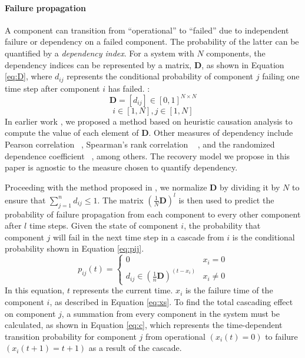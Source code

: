 \documentclass[conference]{IEEEtran}
\begin{document}
\paragraph{Failure propagation} 
A component can transition from ``operational''  to  ``failed'' due to independent failure or dependency on a failed component. The probability of the latter can be quantified by a \emph{dependency index}. For a system with $N$ components, the dependency indices can be represented by a matrix, $\mathbf{D}$, as shown in Equation \ref{eq:D}, where $d_{ij}$ represents the conditional probability of component $j$ failing one time step after component $i$ has failed. :
\begin{equation}
\mathbf{D}=[d_{ij} ] \in [0,1]^{N \times N}  \label{eq:D}
\end{equation}
$$i \in [1, N], j \in [1, N]$$ 
In earlier work \cite{marashi_identification_2021}, we proposed a method based on heuristic causation analysis to compute the value of each element of $\mathbf{D}$. Other measures of dependency include Pearson correlation ~\cite{modarres_measures_2011}, Spearman's rank correlation ~\cite{modarres_measures_2011} , and the randomized dependence coefficient ~\cite{lopez-paz_randomized_2013}, among others. The recovery model we propose in this paper is agnostic to the measure chosen to quantify dependency. 

Proceeding with the method proposed in \cite{marashi_identification_2021}, we normalize $\mathbf{D}$ by dividing it by $N$ to ensure that $\sum^{n}_{j=1}d_{ij} \leq 1$. The matrix $\left( \frac{1}{N} \mathbf{D} \right)^l$ is then used to predict the probability of failure propagation from each component to every other component after $l$ time steps. Given the state of component $i$, the probability that component $j$ will fail in the next time step in a cascade from $i$ is the conditional probability shown in Equation \ref{eq:pij}.
\begin{equation}
p_{ij}(t) = \begin{cases}
    0 & x_i = 0 \\
    d_{ij} \in \left( \frac{1}{n} \mathbf{D} \right)^{(t-x_i)}    &x_i \neq 0
\end{cases}
\label{eq:pij}
\end{equation}
In this equation, $t$ represents the current time. $x_i$ is the failure time of the component $i$, as described in Equation \ref{eq:xs}. 
To find the total cascading effect on component $j$, a summation from every component in the system must be calculated, as shown in Equation \ref{eq:c}, which represents the time-dependent transition probability for component $j$ from operational $(x_i(t) = 0)$ to failure $(x_i(t+1) = t+1)$ as a result of the cascade.
\end{document}

